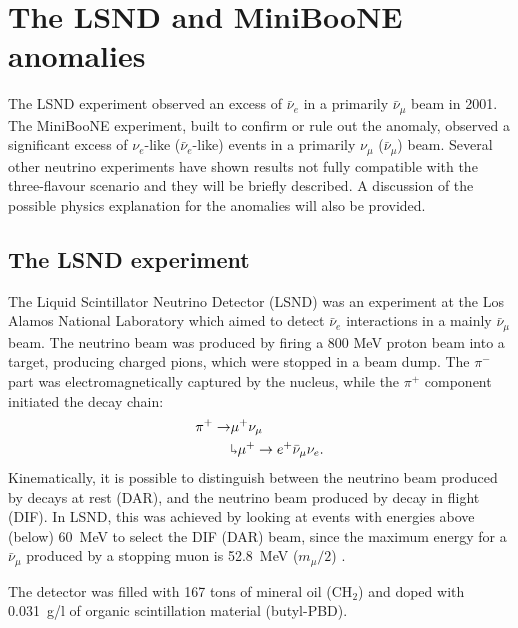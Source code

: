\chapter{The LSND and MiniBooNE anomalies}

\minitoc

The LSND experiment observed an excess of $\bar{\nu}_{e}$ in a primarily $\bar{\nu}_{\mu}$ beam in 2001. The MiniBooNE experiment, built to confirm or rule out the anomaly, observed a significant excess of $\nu_{e}$-like ($\bar{\nu}_{e}$-like) events in a primarily $\nu_{\mu}$ ($\bar{\nu}_{\mu}$) beam. Several other neutrino experiments have shown results not fully compatible with the three-flavour scenario and they will be briefly described.  A discussion of the possible physics explanation for the anomalies will also be provided.

\section{The LSND experiment}
The Liquid Scintillator Neutrino Detector (LSND) was an experiment at the Los Alamos National Laboratory which aimed to detect $\bar{\nu}_e$ interactions in a mainly $\bar{\nu}_{\mu}$ beam. The neutrino beam was produced by firing a 800 MeV proton beam into a target, producing charged pions, which were stopped in a beam dump. The $\pi^-$ part was electromagnetically captured by the nucleus, while the $\pi^+$ component initiated the decay chain:
\begin{align}
    \pi^+ \rightarrow & \mu^+\nu_{\mu}\\
    & \rotatebox[origin=c]{180}{$\Lsh$}	 \mu^{+} \rightarrow e^+\bar{\nu}_{\mu}\nu_{e}.
\end{align}
Kinematically, it is possible to distinguish between the neutrino beam produced by decays at rest (DAR), and the neutrino beam produced by decay in flight (DIF). In LSND, this was achieved by looking at events with energies above (below) 60~MeV to select the DIF (DAR) beam, since the maximum energy for a $\bar{\nu}_{\mu}$ produced by a stopping muon is 52.8~MeV ($m_{\mu}/2$) .

The detector was filled with 167 tons of mineral oil (CH$_2$) and doped with 0.031~g/l of organic scintillation material (butyl-PBD).

